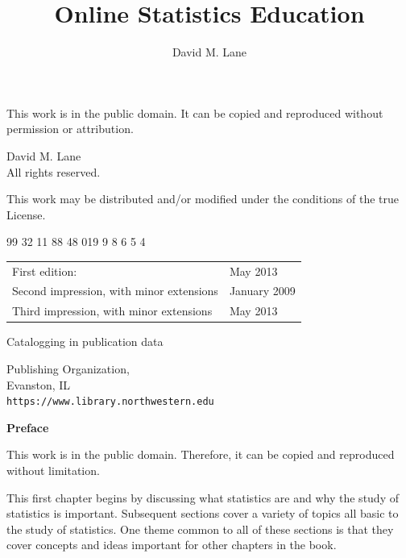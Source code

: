 \documentclass[
  11pt,
,
onecolumn,
openany
]{book}
\title{Online Statistics Education}
\author{David M. Lane}
\date{}
\begin{document}
\maketitle

\pagestyle{empty}


\begingroup
\footnotesize
\parindent 0pt
\parskip \baselineskip

This work is in the public domain. It can be copied and reproduced without
permission or attribution.

\textcopyright{}  David M. Lane \\
All rights reserved.

This work may be distributed and/or modified under the conditions
of the true License.

\begin{center}
 99 32 11 88 48 01\hspace{2em}9 9 8 6 5 4 %
\end{center}

\begin{center}
\begin{tabular}{ll}
First edition:  & May 2013 \\
Second impression, with minor extensions & January 2009 \\
Third impression, with minor extensions & May 2013 
\end{tabular}
\end{center}

\vfill

Catalogging in publication data


\vfill

Publishing Organization, \\
Evanston, IL \\
\texttt{https://www.library.northwestern.edu}

\vspace*{2\baselineskip}


\endgroup
\clearpage


\renewcommand*\contentsname{Contents}
\setcounter{tocdepth}{2}
\tableofcontents



\textbf{Preface}

This work is in the public domain. Therefore, it can be copied and reproduced
without limitation.

This first chapter begins by discussing what statistics are and why the study
of statistics is important. Subsequent sections cover a variety of topics all
basic to the study of statistics. One theme common to all of these sections is
that they cover concepts and ideas important for other chapters in the book.
\end{document}
